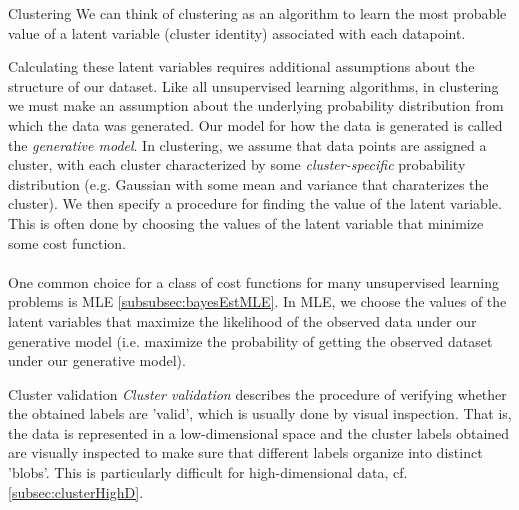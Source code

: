 \begin{mybox}{Clustering}
We can think of clustering as an algorithm to learn the most probable value of a latent variable (cluster identity) associated with each datapoint.
\end{mybox}
 Calculating these latent variables requires additional assumptions about the structure of our dataset. Like all unsupervised learning algorithms, in clustering we must make an assumption about the underlying probability distribution from which the data was generated. Our model for how the data is generated is called the \emph{generative model}. In clustering, we assume that data points are assigned a cluster, with each cluster characterized by some \emph{cluster-specific} probability distribution  (e.g. Gaussian with some mean and variance that charaterizes the cluster). We then specify a procedure for finding the value of the latent variable. This is often done by choosing the values of the latent variable that minimize some cost function.\\
 \\
 One common choice for a class of cost functions for many unsupervised learning problems is MLE \ref{subsubsec:bayesEstMLE}. In MLE, we choose the values of the latent variables that maximize the likelihood of the observed data under our generative model (i.e. maximize the probability of getting the observed dataset under our generative model).
 
 
 
 
 
 
 
 \begin{mybox}{Cluster validation}
 	\label{subsubsec:clusterConceptsValidation}
 	\emph{Cluster validation} describes the procedure of verifying whether the obtained labels are ’valid’, which is usually done by visual inspection. That is, the data is represented in a low-dimensional space and the cluster labels obtained are visually inspected to make sure that different labels organize into distinct ’blobs’. This is particularly difficult for high-dimensional data, cf. \ref{subsec:clusterHighD}.
 \end{mybox}
 
 
 
 
